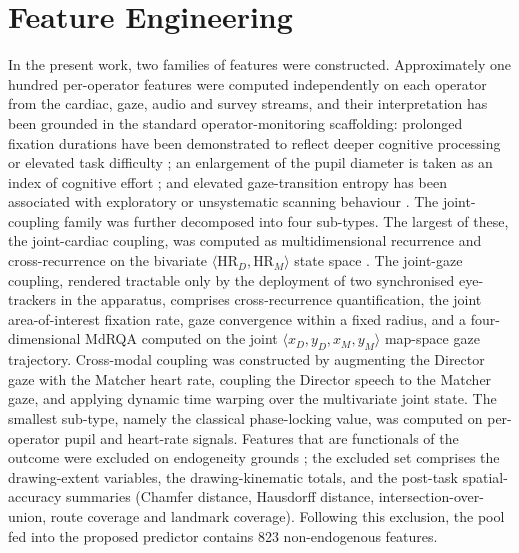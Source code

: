 \section{Feature Engineering}
In the present work, two families of features were constructed. Approximately one hundred per-operator features were computed independently on each operator from the cardiac, gaze, audio and survey streams, and their interpretation has been grounded in the standard operator-monitoring scaffolding: prolonged fixation durations have been demonstrated to reflect deeper cognitive processing or elevated task difficulty \cite{henderson2003human,rayner2009eye}; an enlargement of the pupil diameter is taken as an index of cognitive effort \cite{kahneman1973attention,bhavsar2016pupillometry}; and elevated gaze-transition entropy has been associated with exploratory or unsystematic scanning behaviour \cite{bhavsar2017eye,sharma2016eye}. The joint-coupling family was further decomposed into four sub-types. The largest of these, the joint-cardiac coupling, was computed as multidimensional recurrence and cross-recurrence on the bivariate $\langle\text{HR}_D, \text{HR}_M\rangle$ state space \cite{wallot2016beyond,wallot2018tutorial,marwan2007recurrence}. The joint-gaze coupling, rendered tractable only by the deployment of two synchronised eye-trackers in the apparatus, comprises cross-recurrence quantification, the joint area-of-interest fixation rate, gaze convergence within a fixed radius, and a four-dimensional MdRQA computed on the joint $\langle x_D, y_D, x_M, y_M\rangle$ map-space gaze trajectory. Cross-modal coupling was constructed by augmenting the Director gaze with the Matcher heart rate, coupling the Director speech to the Matcher gaze, and applying dynamic time warping over the multivariate joint state. The smallest sub-type, namely the classical phase-locking value, was computed on per-operator pupil and heart-rate signals. Features that are functionals of the outcome were excluded on endogeneity grounds \cite{kapoor2023leakage}; the excluded set comprises the drawing-extent variables, the drawing-kinematic totals, and the post-task spatial-accuracy summaries (Chamfer distance, Hausdorff distance, intersection-over-union, route coverage and landmark coverage). Following this exclusion, the pool fed into the proposed predictor contains 823 non-endogenous features.

